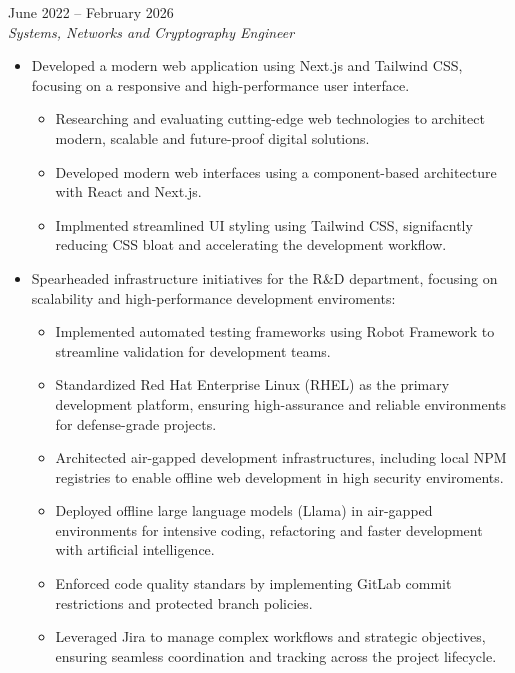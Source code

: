 \documentclass[11pt,a4paper]{article}
\newenvironment{job}[3]{%
  \vspace{0.55em}%
  \noindent{\bfseries #1}\hfill{\color{cvaccent}#2}\\[0.1em]
  \textit{#3}\par
  \begin{itemize}
}{%
  \end{itemize}
}
\begin{document}
\begin{job}{Epicom S.A.}{June 2022 -- February 2026}{Systems, Networks and Cryptography Engineer}
\begin{itemize}
  \end{itemize}
  \item Developed a modern web application using Next.js and Tailwind CSS, focusing on a responsive and high-performance user interface.
  \begin{itemize}
    \item Researching and evaluating cutting-edge web technologies to architect modern, scalable and future-proof digital solutions.
    \item Developed modern web interfaces using a component-based architecture with React and Next.js.
    \item Implmented streamlined UI styling using Tailwind CSS, signifacntly reducing CSS bloat and accelerating the development workflow.
  \end{itemize}
  \item Spearheaded infrastructure initiatives for the R\&D department, focusing on scalability and high-performance development enviroments:
  \begin{itemize}
    \item Implemented automated testing frameworks using Robot Framework to streamline validation for development teams.
    \item Standardized Red Hat Enterprise Linux (RHEL) as the primary development platform, ensuring high-assurance and reliable environments for defense-grade projects.
    \item Architected air-gapped development infrastructures, including local NPM registries to enable offline web development in high security enviroments.
    \item Deployed offline large language models (Llama) in air-gapped environments for intensive coding, refactoring and faster development with artificial intelligence.
    \item Enforced code quality standars by implementing GitLab commit restrictions and protected branch policies.
    \item Leveraged Jira to manage complex workflows and strategic objectives, ensuring seamless coordination and tracking across the project lifecycle.
  \end{itemize}
\end{job}
\end{document}
